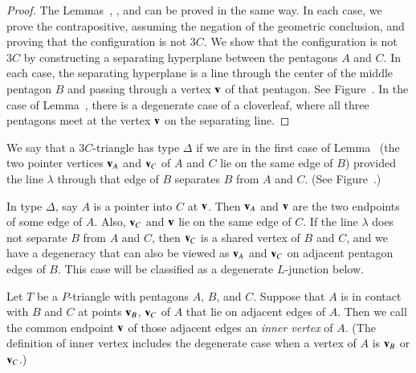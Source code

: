 \begin{proof} The Lemmas~, , and
   can be proved in the same way.  In each case, we
  prove the contrapositive, assuming the negation of the geometric
  conclusion, and proving that the configuration is not $3C$.  We show
  that the configuration is not $3C$ by constructing a separating
  hyperplane between the pentagons $A$ and $C$.  In each case, the
  separating hyperplane is a line through the center of the middle
  pentagon $B$ and passing through a vertex ${\mathbf v}$ of that pentagon.  See
  Figure~.  In the case of Lemma~, there
  is a degenerate case of a cloverleaf, where all three pentagons meet
  at the vertex ${\mathbf v}$ on the separating line.
\end{proof}

\begin{definition}[$\Delta$]
  We say that a $3C$-triangle has type $\Delta$ if we are in the first
  case of Lemma~ (the two pointer vertices ${\mathbf v}_A$ and
  ${\mathbf v}_C$ of $A$ and $C$ lie on the same edge of $B$) provided the line $\lambda$
  through that edge of $B$ separates $B$ from $A$ and $C$. (See
  Figure~.)
\end{definition}



In type $\Delta$, say $A$ is a pointer into $C$ at ${\mathbf v}$.  Then ${\mathbf v}_A$
and ${\mathbf v}$ are the two endpoints of some edge of $A$.  Also, ${\mathbf v}_C$ and
${\mathbf v}$ lie on the same edge of $C$.  If the line $\lambda$ does not
separate $B$ from $A$ and $C$, then ${\mathbf v}_C$ is a shared vertex of $B$
and $C$, and we have a degeneracy that can also be viewed as ${\mathbf v}_A$
and ${\mathbf v}_C$ on adjacent pentagon edges of $B$.  This case will be
classified as a degenerate $L$-junction below.

\begin{definition} Let $T$ be a $P$-triangle with pentagons $A$, $B$,
  and $C$.  Suppose that $A$ is in contact with $B$ and $C$ at points
  ${\mathbf v}_B$, ${\mathbf v}_C$ of $A$ that lie on adjacent edges of $A$.  Then we
  call the common endpoint ${\mathbf v}$ of those adjacent edges an {\it inner
    vertex} of $A$.  (The definition of inner vertex includes the
  degenerate case when a vertex of $A$ is ${\mathbf v}_B$ or ${\mathbf v}_C$.)
\end{definition}

